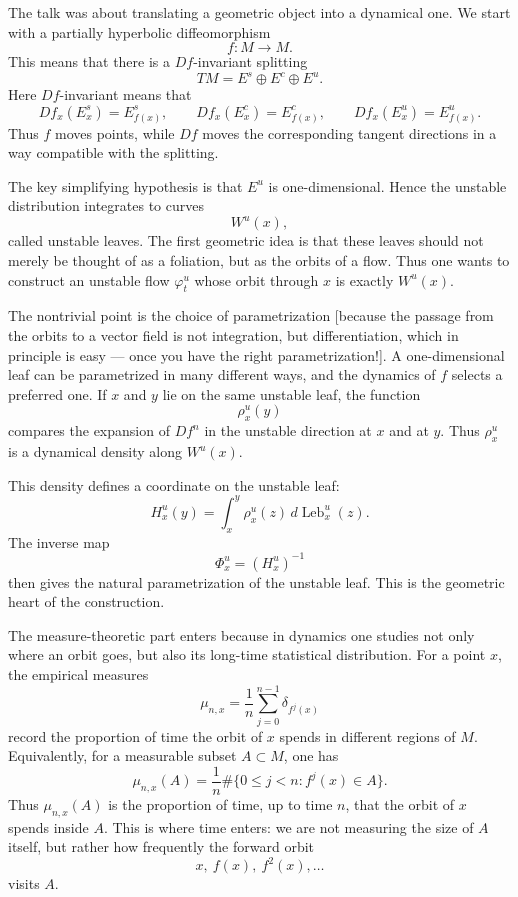 \begin{remark}[Overview]
\label{remark-ai-overview-seminar-unstable-flow}
The talk was about translating a geometric
object into a dynamical one. We start with a
partially hyperbolic diffeomorphism
$$
f:M\to M.
$$
This means that there is a $Df$-invariant
splitting
$$
TM=E^s\oplus E^c\oplus E^u.
$$
Here $Df$-invariant means that
$$
Df_x(E_x^s)=E_{f(x)}^s,\qquad
Df_x(E_x^c)=E_{f(x)}^c,\qquad
Df_x(E_x^u)=E_{f(x)}^u.
$$
Thus $f$ moves points, while $Df$ moves the
corresponding tangent directions in a way
compatible with the splitting.

\medskip\noindent
The key simplifying hypothesis is that
$E^u$ is one-dimensional. Hence the unstable
distribution integrates to curves
$$
W^u(x),
$$
called unstable leaves. The first geometric
idea is that these leaves should not merely
be thought of as a foliation, but as the
orbits of a flow. Thus one wants to construct
an unstable flow $\varphi_t^u$ whose orbit
through $x$ is exactly $W^u(x)$.

\medskip\noindent
The nontrivial point is the choice of
parametrization
[because the passage from the orbits
to a vector field is not integration,
but differentiation, which in principle
is easy --- once you have
the right parametrization!]. 
A one-dimensional leaf can
be parametrized in many different ways, and
the dynamics of $f$ selects a preferred one.
If $x$ and $y$ lie on the same unstable leaf,
the function
$$
\rho_x^u(y)
$$
compares the expansion of $Df^n$ in the
unstable direction at $x$ and at $y$. Thus
$\rho_x^u$ is a dynamical density along
$W^u(x)$.

\medskip\noindent
This density defines a coordinate on the
unstable leaf:
$$
H_x^u(y)
=
\int_x^y
\rho_x^u(z)\,d\operatorname{Leb}_x^u(z).
$$
The inverse map
$$
\Phi_x^u=(H_x^u)^{-1}
$$
then gives the natural parametrization of the
unstable leaf. This is the geometric heart of
the construction.

\medskip\noindent
The measure-theoretic part enters because in
dynamics one studies not only where an orbit
goes, but also its long-time statistical
distribution. For a point $x$, the empirical
measures
$$
\mu_{n,x}
=
\frac{1}{n}
\sum_{j=0}^{n-1}
\delta_{f^j(x)}
$$
record the proportion of time the orbit of
$x$ spends in different regions of $M$.
Equivalently, for a measurable subset
$A\subset M$, one has
$$
\mu_{n,x}(A)
=
\frac{1}{n}
\#\{0\leq j<n:f^j(x)\in A\}.
$$
Thus $\mu_{n,x}(A)$ is the proportion of
time, up to time $n$, that the orbit of $x$
spends inside $A$. This is where time enters:
we are not measuring the size of $A$ itself,
but rather how frequently the forward orbit
$$
x,\ f(x),\ f^2(x),\ldots
$$
visits $A$.


\end{remark}
